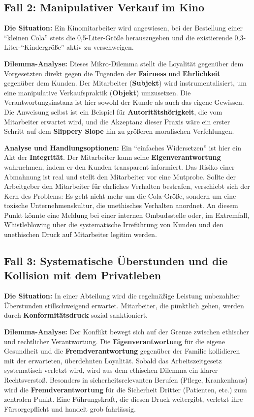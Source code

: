 \documentclass[
    12pt,               %
    a4paper,            %
    ngerman             %
]{scrartcl}
\begin{document}
\subsection{Fall 2: Manipulativer Verkauf im Kino}

\textbf{Die Situation:} Ein Kinomitarbeiter wird angewiesen, bei der Bestellung einer \enquote{kleinen Cola} stets die 0,5-Liter-Größe herauszugeben und die existierende 0,3-Liter-\enquote{Kindergröße} aktiv zu verschweigen.

\textbf{Dilemma-Analyse:}
Dieses Mikro-Dilemma stellt die Loyalität gegenüber dem Vorgesetzten direkt gegen die Tugenden der \textbf{Fairness} und \textbf{Ehrlichkeit} gegenüber dem Kunden. Der Mitarbeiter (\textbf{Subjekt}) wird instrumentalisiert, um eine manipulative Verkaufspraktik (\textbf{Objekt}) umzusetzen. Die Verantwortungsinstanz ist hier sowohl der Kunde als auch das eigene Gewissen. Die Anweisung selbst ist ein Beispiel für \textbf{Autoritätshörigkeit}, die vom Mitarbeiter erwartet wird, und die Akzeptanz dieser Praxis wäre ein erster Schritt auf dem \textbf{Slippery Slope} hin zu größeren moralischen Verfehlungen.

\textbf{Analyse und Handlungsoptionen:}
Ein \enquote{einfaches Widersetzen} ist hier ein Akt der \textbf{Integrität}. Der Mitarbeiter kann seine \textbf{Eigenverantwortung} wahrnehmen, indem er den Kunden transparent informiert. Das Risiko einer Abmahnung ist real und stellt den Mitarbeiter vor eine Mutprobe. Sollte der Arbeitgeber den Mitarbeiter für ehrliches Verhalten bestrafen, verschiebt sich der Kern des Problems: Es geht nicht mehr um die Cola-Größe, sondern um eine toxische Unternehmenskultur, die unethisches Verhalten anordnet. An diesem Punkt könnte eine Meldung bei einer internen Ombudsstelle oder, im Extremfall, Whistleblowing über die systematische Irreführung von Kunden und den unethischen Druck auf Mitarbeiter legitim werden.

\subsection{Fall 3: Systematische Überstunden und die Kollision mit dem Privatleben}

\textbf{Die Situation:} In einer Abteilung wird die regelmäßige Leistung unbezahlter Überstunden stillschweigend erwartet. Mitarbeiter, die pünktlich gehen, werden durch \textbf{Konformitätsdruck} sozial sanktioniert.

\textbf{Dilemma-Analyse:}
Der Konflikt bewegt sich auf der Grenze zwischen ethischer und rechtlicher Verantwortung. Die \textbf{Eigenverantwortung} für die eigene Gesundheit und die \textbf{Fremdverantwortung} gegenüber der Familie kollidieren mit der erwarteten, überdehnten Loyalität. Sobald das Arbeitszeitgesetz systematisch verletzt wird, wird aus dem ethischen Dilemma ein klarer Rechtsverstoß. Besonders in sicherheitsrelevanten Berufen (Pflege, Krankenhaus) wird die \textbf{Fremdverantwortung} für die Sicherheit Dritter (Patienten, etc.) zum zentralen Punkt. Eine Führungskraft, die diesen Druck weitergibt, verletzt ihre Fürsorgepflicht und handelt grob fahrlässig.
\end{document}
